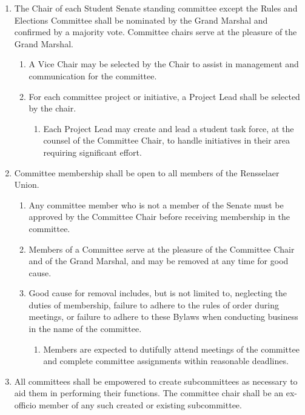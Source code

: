 \documentclass{bylaws}
\begin{document}
\begin{enumerate}

\item The Chair of each Student Senate standing committee except the Rules and Elections Committee shall be nominated by the
Grand Marshal and confirmed by a majority vote. Committee chairs serve at the pleasure of the Grand Marshal.
\begin{enumerate}
\item A Vice Chair may be selected by the Chair to assist in management and communication for the committee.
\item For each committee project or initiative, a Project Lead shall be selected by the chair.
\begin{enumerate}
\item Each Project Lead may create and lead a student task force, at the counsel of the Committee Chair, to handle initiatives
in their area requiring significant effort.
\end{enumerate}
\end{enumerate}

\item Committee membership shall be open to all members of the Rensselaer Union.
\begin{enumerate}
\item Any committee member who is not a member of the Senate must be approved by the Committee Chair before receiving
membership in the committee.
\item Members of a Committee serve at the pleasure of the Committee Chair and of the Grand Marshal, and may be removed at
any time for good cause.
\item Good cause for removal includes, but is not limited to, neglecting the duties of membership, failure to adhere to the rules of
order during meetings, or failure to adhere to these Bylaws when conducting business in the name of the committee.
\begin{enumerate}
\item Members are expected to dutifully attend meetings of the committee and complete committee assignments within reasonable deadlines.
\end{enumerate}
\end{enumerate}

\item All committees shall be empowered to create subcommittees as necessary to aid them in performing their functions. The
committee chair shall be an ex-officio member of any such created or existing subcommittee.


\end{enumerate}
\end{document}
